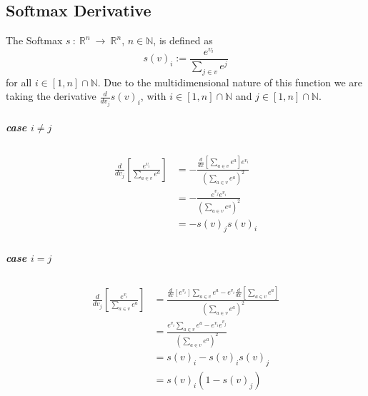\documentclass[12pt]{article}
\begin{document}
%
\subsection{Softmax Derivative}
The Softmax \(s~:~\mathbb R^n~\to~\mathbb R^n\), \(n\in\mathbb N\), is defined as
\begin{equation} \label{eq:proof:softmax}
s(v)_i := \frac{e^{v_i}}{\sum_{j \in v} e^j}
\end{equation}
for all \(i \in [1,n]\cap\mathbb N\). Due to the multidimensional nature of this function we are taking the derivative \(\frac{d}{dv_j}s(v)_i\), with \(i \in [1,n]\cap\mathbb N\) and \(j \in [1,n]\cap\mathbb N\). 
\subparagraph*{case \(i \neq j\)}
\begin{align}
\begin{split}
\frac{d}{dv_j}\left[\frac{e^{v_i}}{\sum_{a \in v} e^a}\right] &= -\frac{\frac{d}{dx}\left[\sum_{a \in v} e^a\right]e^{v_i}}{(\sum_{a \in v} e^a)^2}\\
&= -\frac{e^{v_j} e^{v_i}}{(\sum_{a \in v} e^a)^2}\\
&= -s(v)_j s(v)_i
\end{split}
\end{align}
\subparagraph*{case \(i = j\)}
\begin{align}
\begin{split}
\frac{d}{dv_j}\left[\frac{e^{v_i}}{\sum_{a \in v} e^a}\right] 
&= \frac{\frac{d}{dx}\left[e^{v_i}\right]\sum_{a \in v} e^a - e^{v_i}\frac{d}{dx}\left[\sum_{a \in v} e^a\right]}{(\sum_{a \in v} e^a)^2}\\
&= \frac{e^{v_i}\sum_{a \in v} e^a - e^{v_i}e^{v_j}}{(\sum_{a \in v} e^a)^2}\\
&= s(v)_i - s(v)_i s(v)_j\\
&= s(v)_i (1 - s(v)_j)
\end{split}
\end{align}
\end{document}
